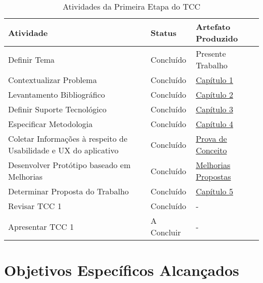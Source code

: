 \begin{table}[h!]
	\centering
	\caption{Atividades da Primeira Etapa do TCC}
	\label{tab07}
	\begin{tabularx}{\textwidth}{p{8cm}|p{2cm}|p{4cm}}
	\hline
    Atividade                                                        & Status       & Artefato Produzido             \\ \hline
    Definir Tema                                                     & Concluído    & Presente Trabalho              \\
    Contextualizar Problema                                          & Concluído    & \hyperref[chap:Introducao]{Capítulo 1}                   \\
    Levantamento Bibliográfico                                       & Concluído    & \hyperref[chap:Referencial]{Capítulo 2}                     \\
    Definir Suporte Tecnológico                                      & Concluído    & \hyperref[chap:ReferencialTech]{Capítulo 3}                   \\
    Especificar Metodologia                                          & Concluído    & \hyperref[chap:Metodologia]{Capítulo 4}                     \\
    Coletar Informações à respeito de Usabilidade e UX do aplicativo & Concluído    & \hyperref[sec:Prova de Conceito]{Prova de Conceito} \\
    Desenvolver Protótipo baseado em Melhorias                       & Concluído    & \hyperref[sec:Melhorias Propostas]{Melhorias Propostas}         \\
    Determinar Proposta do Trabalho                                  & Concluído    & \hyperref[chap:Proposta]{Capítulo 5}                     \\
    Revisar TCC 1                                                    & Concluído    & -                              \\ 
    Apresentar TCC 1                                                 & A Concluir   & -                              \\ \hline
	\end{tabularx}
\end{table}

\section{Objetivos Específicos Alcançados}
\label{sec:Objetivos Especificos Alcancados}

